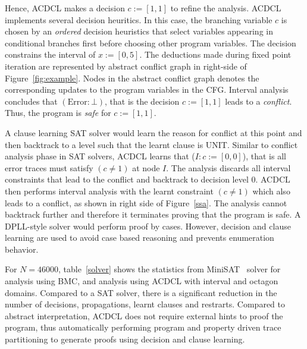 Hence, ACDCL makes a decision $c:=[1,1]$ to refine the analysis.  
ACDCL implements several decision heuritics.  In this case, the 
branching variable $c$ is chosen by an {\em ordered} decision 
heuristics that select variables appearing in conditional branches 
first before choosing other program variables. 
The decision constrains the interval of $x:=[0,5]$.  The deductions made 
during fixed point iteration are represented by abstract conflict 
graph in right-side of Figure~\ref{fig:example}.  Nodes in the abstract 
conflict graph denotes the corresponding updates to the program 
variables in the CFG.  Interval analysis concludes that $(\text{Error}:\bot)$, that 
is the decision $c:=[1,1]$ leads to a {\em conflict}.  Thus, 
the program is {\em safe} for $c:=[1,1]$.  

A clause learning SAT solver would learn the reason for conflict at this 
point and then backtrack to a level such that the learnt clause is UNIT.  
Similar to conflict analysis phase in SAT solvers, ACDCL learns that 
(\(I: c:=[0,0]\)), that is all error traces must satisfy $(c \neq 1)$ 
at node $I$.  The analysis discards all interval constraints that
lead to the conflict and backtrack to decision level 0.  ACDCL then 
performs interval analysis with the learnt constraint $(c \neq 1)$ which also 
leads to a conflict, as shown in right side of Figure~\ref{ssa}.  The 
analysis cannot backtrack further and therefore it terminates proving 
that the program is safe.  A DPLL-style solver would perform proof by 
cases.  However, decision and clause learning are used to avoid case 
based reasoning and prevents enumeration behavior.     
   
For $N=46000$, table~\ref{solver} shows the statistics from 
MiniSAT~\cite{minisat} solver for analysis using BMC, and 
analysis using ACDCL with interval and octagon domains.  
Compared to a SAT solver, there is a significant reduction 
in the number of decisions, propagations, learnt clauses and 
restrarts.  Compared to abstract interpretation, ACDCL does 
not require external hints to proof the program, thus 
automatically performing program and property driven trace 
partitioning to generate proofs using decision and clause learning.  
